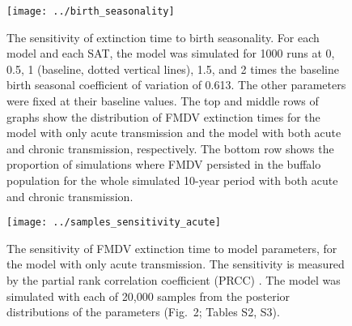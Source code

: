 \documentclass[12pt]{article}
\begin{document}
\begin{figure}
  \centering
  \texttt{[image: ../birth\_seasonality]}
  \caption{The sensitivity of extinction time to birth seasonality.
    For each model and each SAT, the model was simulated for
    1000 runs at 0, 0.5, 1 (baseline, dotted vertical lines), 1.5, and
    2 times the baseline birth seasonal coefficient of variation of
    0.613.
    The other parameters were fixed at their baseline values.
    The top and middle rows of graphs show the distribution of
    FMDV extinction times for the model with only acute transmission
    and the model with both acute and chronic transmission,
    respectively.
    The bottom row shows the proportion of simulations where FMDV
    persisted in the buffalo population for the whole simulated
    10-year period with both acute and chronic transmission.}
\end{figure}

\begin{figure}
  \centering
  \texttt{[image: ../samples\_sensitivity\_acute]}
  \caption{The sensitivity of FMDV extinction time to model
    parameters, for the model with only acute transmission.
    The sensitivity is measured by the partial rank correlation
    coefficient (PRCC) \autocite{blower_1994}.
    The model was simulated with each of 20,000 samples from the
    posterior distributions of the parameters
    (Fig.~2; Tables S2, S3).}
\end{figure}
\end{document}
